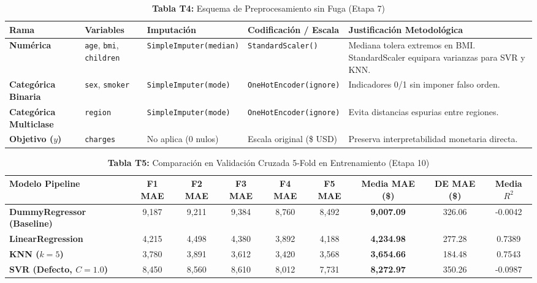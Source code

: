 \documentclass[11pt,a4paper]{article}
\begin{document}
\begin{table}[H]
\centering
\caption{\textbf{Tabla T4:} Esquema de Preprocesamiento sin Fuga (Etapa 7)}
\footnotesize
\begin{tabularx}{\textwidth}{l p{3.5cm} p{3.2cm} p{3.2cm} p{4.5cm}}
\toprule
\textbf{Rama} & \textbf{Variables} & \textbf{Imputación} & \textbf{Codificación / Escala} & \textbf{Justificación Metodológica} \\
\midrule
\textbf{Numérica} & \texttt{age}, \texttt{bmi}, \texttt{children} & \texttt{SimpleImputer(median)} & \texttt{StandardScaler()} & Mediana tolera extremos en BMI. StandardScaler equipara varianzas para SVR y KNN. \\
\textbf{Categórica Binaria} & \texttt{sex}, \texttt{smoker} & \texttt{SimpleImputer(mode)} & \texttt{OneHotEncoder(ignore)} & Indicadores 0/1 sin imponer falso orden. \\
\textbf{Categórica Multiclase} & \texttt{region} & \texttt{SimpleImputer(mode)} & \texttt{OneHotEncoder(ignore)} & Evita distancias espurias entre regiones. \\
\textbf{Objetivo ($y$)} & \texttt{charges} & No aplica (0 nulos) & Escala original (\$ USD) & Preserva interpretabilidad monetaria directa. \\
\bottomrule
\end{tabularx}
\end{table}

\begin{table}[H]
\centering
\caption{\textbf{Tabla T5:} Comparación en Validación Cruzada 5-Fold en Entrenamiento (Etapa 10)}
\footnotesize
\begin{tabularx}{\textwidth}{l c c c c c c c c}
\toprule
\textbf{Modelo Pipeline} & \textbf{F1 MAE} & \textbf{F2 MAE} & \textbf{F3 MAE} & \textbf{F4 MAE} & \textbf{F5 MAE} & \textbf{Media MAE (\$)} & \textbf{DE MAE (\$)} & \textbf{Media $R^2$} \\
\midrule
\textbf{DummyRegressor (Baseline)} & 9,187 & 9,211 & 9,384 & 8,760 & 8,492 & \textbf{9,007.09} & 326.06 & -0.0042 \\
\textbf{LinearRegression} & 4,215 & 4,498 & 4,380 & 3,892 & 4,188 & \textbf{4,234.98} & 277.28 & 0.7389 \\
\textbf{KNN ($k=5$)} & 3,780 & 3,891 & 3,612 & 3,420 & 3,568 & \textbf{3,654.66} & 184.48 & 0.7543 \\
\textbf{SVR (Defecto, $C=1.0$)} & 8,450 & 8,560 & 8,610 & 8,012 & 7,731 & \textbf{8,272.97} & 350.26 & -0.0987 \\
\bottomrule
\end{tabularx}
\end{table}
\end{document}
